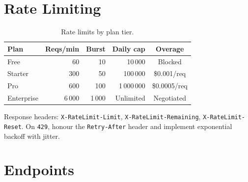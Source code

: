 \documentclass[
    language=english,
    doctype=article,
    institution=none,
]{../../omnilatex}
\begin{document}
\section{Rate Limiting}
\label{sec:ratelimits}

\begin{table}[htbp]
    \centering
    \caption{Rate limits by plan tier.}
    \label{tab:ratelimits}
    \begin{tabular}{@{}lrrrc@{}}
        \toprule
        \textbf{Plan} & \textbf{Reqs/min} & \textbf{Burst}
            & \textbf{Daily cap} & \textbf{Overage} \\
        \midrule
        Free       & 60      & 10     & 10\,000      & Blocked \\
        Starter    & 300     & 50     & 100\,000     & \$0.001/req \\
        Pro        & 600     & 100    & 1\,000\,000  & \$0.0005/req \\
        Enterprise & 6\,000  & 1\,000 & Unlimited    & Negotiated \\
        \bottomrule
    \end{tabular}
\end{table}

Response headers: \texttt{X-RateLimit-Limit}, \texttt{X-RateLimit-Remaining},
\texttt{X-RateLimit-Reset}.  On \texttt{429}, honour the
\texttt{Retry-After} header and implement exponential backoff with jitter.

\section{Endpoints}
\label{sec:endpoints}
\end{document}
